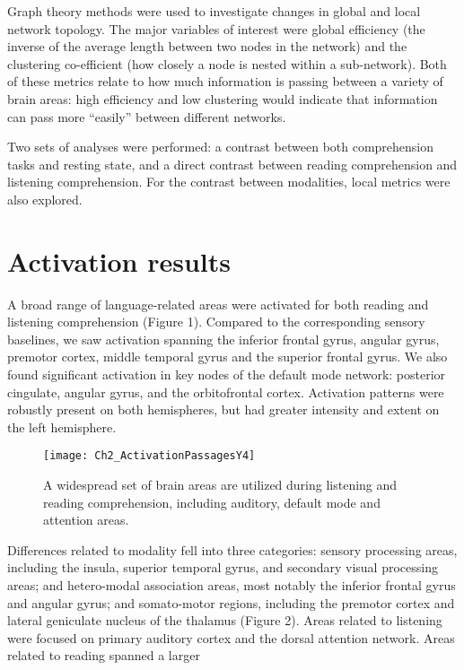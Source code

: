 Graph theory methods were used to investigate changes in global and local network topology. The major variables of interest were global efficiency (the inverse of the average length between two nodes in the network) and the clustering co-efficient (how closely a node is nested within a sub-network). Both of these metrics relate to how much information is passing between a variety of brain areas: high efficiency and low clustering would indicate that information can pass more “easily” between different networks. 

Two sets of analyses were performed: a contrast between both comprehension tasks and resting state, and a direct contrast between reading comprehension and listening comprehension. For the contrast between modalities, local metrics were also explored.

\section{Activation results}

A broad range of language-related areas were activated for both reading and listening comprehension (Figure 1). Compared to the corresponding sensory baselines, we saw activation spanning the inferior frontal gyrus, angular gyrus, premotor cortex, middle temporal gyrus and the superior frontal gyrus. We also found significant activation in key nodes of the default mode network: posterior cingulate, angular gyrus, and the orbitofrontal cortex. Activation patterns were robustly present on both hemispheres, but had greater intensity and extent on the left hemisphere. 

\begin{figure}[tp]
\centering
\texttt{[image: Ch2\_ActivationPassagesY4]}
    \caption[Language comprehension spans many brain areas.]{A widespread set of brain areas are utilized during listening and reading comprehension, including auditory, default mode and attention areas.}
\label{fig:ch2_passages}
\end{figure}

Differences related to modality fell into three categories: sensory processing areas, including the insula, superior temporal gyrus, and secondary visual processing areas; and hetero-modal association areas, most notably the inferior frontal gyrus and angular gyrus; and somato-motor regions, including the premotor cortex and lateral geniculate nucleus of the thalamus (Figure 2). Areas related to listening were focused on primary auditory cortex and the dorsal attention network. Areas related to reading spanned a larger 

